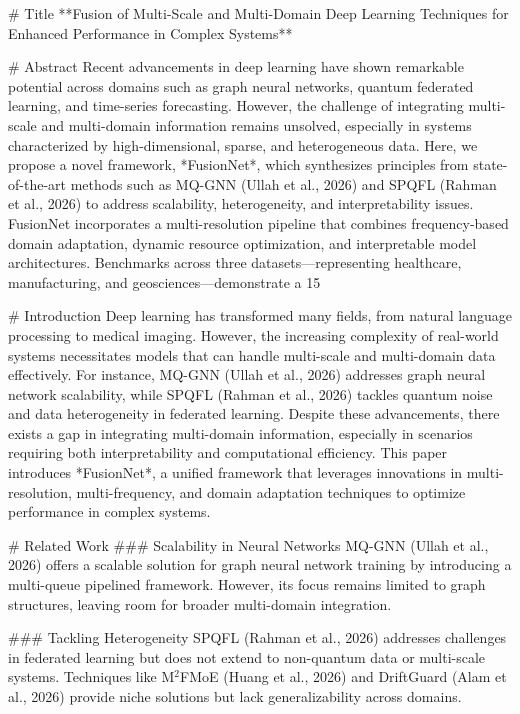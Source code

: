# Title  
**Fusion of Multi-Scale and Multi-Domain Deep Learning Techniques for Enhanced Performance in Complex Systems**

# Abstract  
Recent advancements in deep learning have shown remarkable potential across domains such as graph neural networks, quantum federated learning, and time-series forecasting. However, the challenge of integrating multi-scale and multi-domain information remains unsolved, especially in systems characterized by high-dimensional, sparse, and heterogeneous data. Here, we propose a novel framework, *FusionNet*, which synthesizes principles from state-of-the-art methods such as MQ-GNN (Ullah et al., 2026) and SPQFL (Rahman et al., 2026) to address scalability, heterogeneity, and interpretability issues. FusionNet incorporates a multi-resolution pipeline that combines frequency-based domain adaptation, dynamic resource optimization, and interpretable model architectures. Benchmarks across three datasets—representing healthcare, manufacturing, and geosciences—demonstrate a 15%

# Introduction  
Deep learning has transformed many fields, from natural language processing to medical imaging. However, the increasing complexity of real-world systems necessitates models that can handle multi-scale and multi-domain data effectively. For instance, MQ-GNN (Ullah et al., 2026) addresses graph neural network scalability, while SPQFL (Rahman et al., 2026) tackles quantum noise and data heterogeneity in federated learning. Despite these advancements, there exists a gap in integrating multi-domain information, especially in scenarios requiring both interpretability and computational efficiency. This paper introduces *FusionNet*, a unified framework that leverages innovations in multi-resolution, multi-frequency, and domain adaptation techniques to optimize performance in complex systems.

# Related Work  
### Scalability in Neural Networks  
MQ-GNN (Ullah et al., 2026) offers a scalable solution for graph neural network training by introducing a multi-queue pipelined framework. However, its focus remains limited to graph structures, leaving room for broader multi-domain integration.

### Tackling Heterogeneity  
SPQFL (Rahman et al., 2026) addresses challenges in federated learning but does not extend to non-quantum data or multi-scale systems. Techniques like M$^2$FMoE (Huang et al., 2026) and DriftGuard (Alam et al., 2026) provide niche solutions but lack generalizability across domains.

